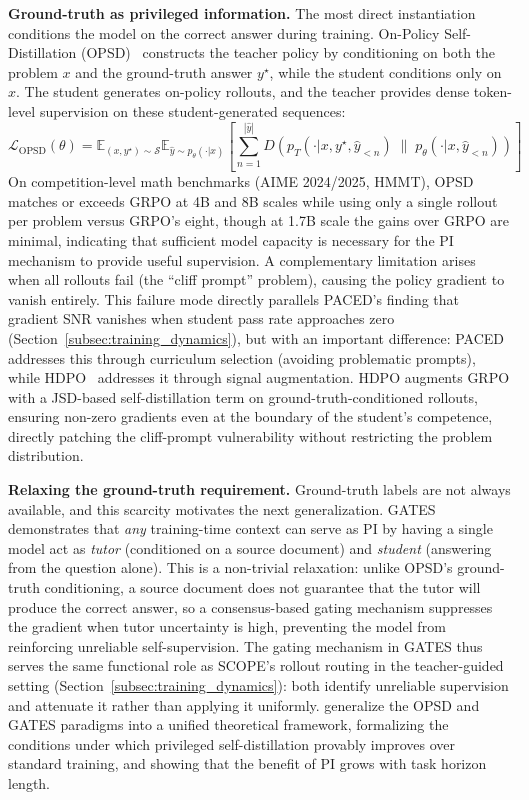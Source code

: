 \documentclass{article} %
\newcommand{\ptheta}{p_\theta}
\newcommand{\pteacher}{p_T}
\begin{document}
\textbf{Ground-truth as privileged information.}
The most direct instantiation conditions the model on the correct answer during training. On-Policy Self-Distillation (OPSD)~\citep{2601.18734} constructs the teacher policy by conditioning on both the problem $x$ and the ground-truth answer $y^\star$, while the student conditions only on $x$. The student generates on-policy rollouts, and the teacher provides dense token-level supervision on these student-generated sequences:
\begin{equation}
    \mathcal{L}_{\text{OPSD}}(\theta) = \mathbb{E}_{(x, y^\star) \sim \mathcal{S}} \mathbb{E}_{\hat{y} \sim \ptheta(\cdot|x)} \left[ \sum_{n=1}^{|\hat{y}|} D\!\left( \pteacher(\cdot|x, y^\star, \hat{y}_{<n}) \;\|\; \ptheta(\cdot|x, \hat{y}_{<n}) \right) \right]
\end{equation}
On competition-level math benchmarks (AIME 2024/2025, HMMT), OPSD matches or exceeds GRPO at 4B and 8B scales while using only a single rollout per problem versus GRPO's eight, though at 1.7B scale the gains over GRPO are minimal, indicating that sufficient model capacity is necessary for the PI mechanism to provide useful supervision. A complementary limitation arises when all rollouts fail (the ``cliff prompt'' problem), causing the policy gradient to vanish entirely. This failure mode directly parallels PACED's finding that gradient SNR vanishes when student pass rate approaches zero (Section~\ref{subsec:training_dynamics}), but with an important difference: PACED addresses this through curriculum selection (avoiding problematic prompts), while HDPO~\citep{2603.23871} addresses it through signal augmentation. HDPO augments GRPO with a JSD-based self-distillation term on ground-truth-conditioned rollouts, ensuring non-zero gradients even at the boundary of the student's competence, directly patching the cliff-prompt vulnerability without restricting the problem distribution.

\textbf{Relaxing the ground-truth requirement.}
Ground-truth labels are not always available, and this scarcity motivates the next generalization. GATES~\citep{2602.20574} demonstrates that \emph{any} training-time context can serve as PI by having a single model act as \emph{tutor} (conditioned on a source document) and \emph{student} (answering from the question alone). This is a non-trivial relaxation: unlike OPSD's ground-truth conditioning, a source document does not guarantee that the tutor will produce the correct answer, so a consensus-based gating mechanism suppresses the gradient when tutor uncertainty is high, preventing the model from reinforcing unreliable self-supervision. The gating mechanism in GATES thus serves the same functional role as SCOPE's rollout routing in the teacher-guided setting (Section~\ref{subsec:training_dynamics}): both identify unreliable supervision and attenuate it rather than applying it uniformly. \citet{2602.04942} generalize the OPSD and GATES paradigms into a unified theoretical framework, formalizing the conditions under which privileged self-distillation provably improves over standard training, and showing that the benefit of PI grows with task horizon length.
\end{document}
